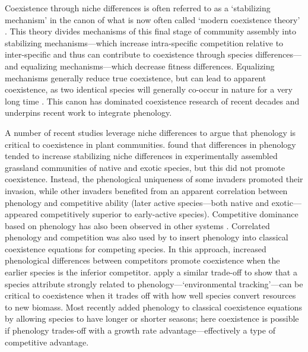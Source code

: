 \documentclass[11pt]{article}
\newcommand{\R}[1]{\label{}\linelabel{#1}}
\begin{document}
Coexistence through niche differences is often referred to as a `stabilizing mechanism' in the canon of what is now often called `modern coexistence theory' \citep{Chesson:2000vd}. This theory divides mechanisms of this final stage of community assembly into stabilizing mechanisms---which increase intra-specific competition relative to inter-specific and thus can contribute to coexistence through species differences---and equalizing mechanisms---which decrease fitness differences. Equalizing mechanisms generally reduce true coexistence, but can lead to apparent coexistence, as two identical species will generally co-occur in nature for a very long time  \citep[until one is lost to stochasticity,][]{Hubbell:2001vo}. This canon has dominated coexistence research of recent decades and underpins recent work to integrate phenology.

A number of recent studies leverage niche differences to argue that phenology is critical to coexistence in plant communities. \citet{godoy2014} found that differences in phenology tended to increase stabilizing niche differences \R{whatnicheS}\citep[as estimated through a parameterized competition model, which is commonly used today, but does not link to clear mechanisms, see][]{mcpeek2022coexistence}\R{whatnicheE} in experimentally assembled grassland communities of native and exotic species, but this did not promote coexistence. Instead, the phenological uniqueness of some invaders promoted their invasion, while other invaders benefited from an apparent correlation between phenology and competitive ability (later active species---both native and exotic---appeared competitively superior to early-active species). Competitive dominance based on phenology has also been observed in other systems \citep{wagg2017functional}. Correlated phenology and competition was also used by \citet{rudolf2019role} to insert phenology into classical coexistence equations for competing species. In this approach, increased phenological differences between competitors promote coexistence when the earlier species is the inferior competitor. \citet{wolkovich2021phenological} apply a similar trade-off to show that a species attribute strongly related to phenology---`environmental tracking'---can be critical to coexistence when it trades off with how well species convert resources to new biomass. Most recently \citet{levine2022competition} added phenology to classical coexistence equations by allowing species to have longer or shorter seasons; here coexistence is possible if phenology trades-off with a growth rate advantage---effectively a type of competitive advantage.  
\end{document}
